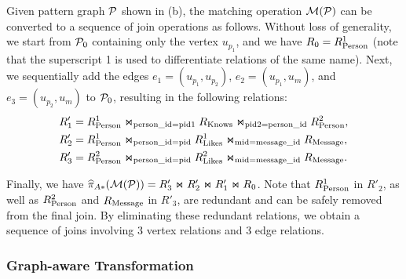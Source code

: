 \begin{example}
  \label{ex:spjm-to-spj}
  Given pattern graph $\mathcal{P}$ shown in (b), the matching operation $\mathcal{M}(\mathcal{P})$ can be converted to a sequence of join operations as follows. Without loss of generality, we start from $\mathcal{P}_0$ containing only the vertex $u_{p_1}$, and we have ${R_{0}} = {R^{1}_{\text{Person}}}$ (note that the superscript 1 is used to differentiate relations of the same name).
  Next, we sequentially add the edges $e_1 = (u_{p_1}, u_{p_2})$, $e_2 = (u_{p_1}, u_{m})$, and $e_3 = (u_{p_2}, u_m)$ to $\mathcal{P}_0$, resulting in the following relations:
  \begin{equation*}
    \begin{split}
    R'_1 &= {R^{1}_{\text{Person}}} \Join_{\text{person\_id}=\text{pid1}} {R_{\text{Knows}}} \Join_{\text{pid2}=\text{person\_id}} {R^{2}_{\text{Person}}}, \\
    R'_2 &= {R^{1}_{\text{Person}}} \Join_{\text{person\_id}=\text{pid}} {R^{1}_{\text{Likes}}} \Join_{\text{mid}=\text{message\_id}} {R_{\text{Message}}}, \\
    R'_3 &= {R^{2}_{\text{Person}}} \Join_{\text{person\_id}=\text{pid}} {R^{2}_{\text{Likes}}} \Join_{\text{mid}=\text{message\_id}} {R_{\text{Message}}}.
    \end{split}
    \end{equation*}

    Finally, we have $\widehat{\pi}_{A*}(\mathcal{M}(\mathcal{P})) = R'_3 \Join R'_2 \Join R'_1 \Join {\ensuremath R_{0}}$.
    Note that ${R^{1}_{\text{Person}}}$ in $R'_2$, as well as ${R^{2}_{\text{Person}}}$ and ${R_{\text{Message}}}$ in $R'_3$, are redundant and can be safely removed from the final join. By eliminating these redundant relations, we obtain a sequence of joins involving 3 vertex relations and 3 edge relations.
\end{example}


\subsubsection{Graph-aware Transformation}
\label{sec:graph-aware}

